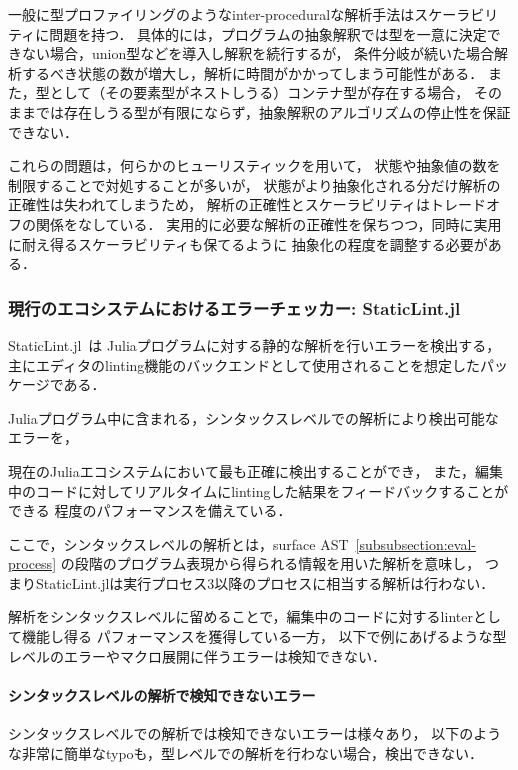 一般に型プロファイリングのようなinter-proceduralな解析手法はスケーラビリティに問題を持つ．
具体的には，プログラムの抽象解釈では型を一意に決定できない場合，union型などを導入し解釈を続行するが，
条件分岐が続いた場合解析するべき状態の数が増大し，解析に時間がかかってしまう可能性がある．
また，型として（その要素型がネストしうる）コンテナ型が存在する場合，
そのままでは存在しうる型が有限にならず，抽象解釈のアルゴリズムの停止性を保証できない．

これらの問題は，何らかのヒューリスティックを用いて，
状態や抽象値の数を制限することで対処することが多いが，
状態がより抽象化される分だけ解析の正確性は失われてしまうため，
解析の正確性とスケーラビリティはトレードオフの関係をなしている．
実用的に必要な解析の正確性を保ちつつ，同時に実用に耐え得るスケーラビリティも保てるように
抽象化の程度を調整する必要がある．

\subsubsection{現行のエコシステムにおけるエラーチェッカー: StaticLint.jl} \label{subsubsection:staticlint}

StaticLint.jl~\cite{staticlint}は
Juliaプログラムに対する静的な解析を行いエラーを検出する，
主にエディタのlinting機能のバックエンドとして使用されることを想定したパッケージである．

Juliaプログラム中に含まれる，シンタックスレベルでの解析により検出可能なエラーを，
\date{\today}現在のJuliaエコシステムにおいて最も正確に検出することができ，
また，編集中のコードに対してリアルタイムにlintingした結果をフィードバックすることができる
程度のパフォーマンスを備えている．

ここで，シンタックスレベルの解析とは，surface AST~\ref{subsubsection:eval-process}
の段階のプログラム表現から得られる情報を用いた解析を意味し，
つまりStaticLint.jlは実行プロセス3以降のプロセスに相当する解析は行わない．

解析をシンタックスレベルに留めることで，編集中のコードに対するlinterとして機能し得る
パフォーマンスを獲得している一方，
以下で例にあげるような型レベルのエラーやマクロ展開に伴うエラーは検知できない．

\paragraph{シンタックスレベルの解析で検知できないエラー} \label{paragraph:syntax-analysis-limitation}

シンタックスレベルでの解析では検知できないエラーは様々あり，
以下のような非常に簡単なtypoも，型レベルでの解析を行わない場合，検出できない．

